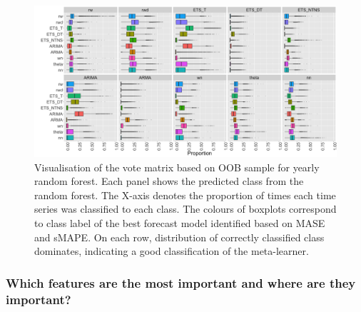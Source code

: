 \documentclass[11pt,a4paper,]{article}
\begin{document}
\begin{figure}[h]

{\centering \includegraphics[width=\textwidth]{figure/yearlyoob-1} 

}

\caption{Visualisation of the vote matrix based on OOB sample for yearly random forest. Each panel shows the predicted class from the random forest. The X-axis denotes the proportion of times each time series was classified to each class. The colours of boxplots correspond to class label of the best forecast model identified based on MASE and sMAPE. On each row, distribution of correctly classified class dominates, indicating a good classification of the meta-learner.}\label{fig:yearlyoob}
\end{figure}

\clearpage

\hypertarget{which-features-are-the-most-important-and-where-are-they-important}{%
\subsubsection{Which features are the most important and where are they important?}\label{which-features-are-the-most-important-and-where-are-they-important}}
\end{document}
